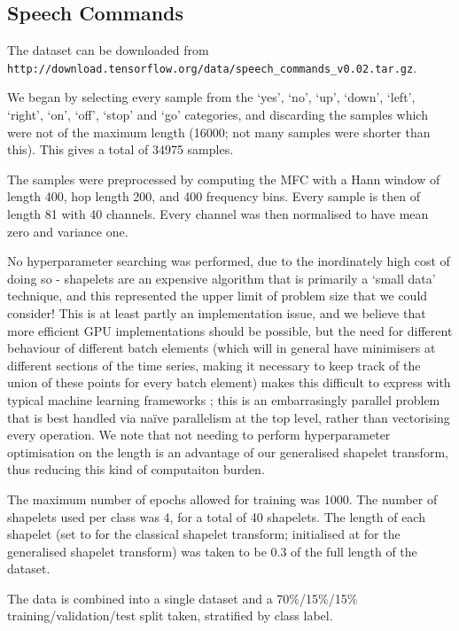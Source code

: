 \documentclass{article}
\theoremstyle{plain}
\theoremstyle{definition}
\begin{document}
	\subsection{Speech Commands}
	The dataset can be downloaded from\\ \texttt{http://download.tensorflow.org/data/speech\_commands\_v0.02.tar.gz}.
	
	We began by selecting every sample from the `yes', `no', `up', `down', `left', `right', `on', `off', `stop' and `go' categories, and discarding the samples which were not of the maximum length (16000; not many samples were shorter than this). This gives a total of 34975 samples.
	
	The samples were preprocessed by computing the MFC with a Hann window of length 400, hop length 200, and 400 frequency bins. Every sample is then of length 81 with 40 channels. Every channel was then normalised to have mean zero and variance one.
	
	No hyperparameter searching was performed, due to the inordinately high cost of doing so - shapelets are an expensive algorithm that is primarily a `small data' technique, and this represented the upper limit of problem size that we could consider! This is at least partly an implementation issue, and we believe that more efficient GPU implementations should be possible, but the need for different behaviour of different batch elements (which will in general have minimisers at different sections of the time series, making it necessary to keep track of the union of these points for every batch element) makes this difficult to express with typical machine learning frameworks \cite{tensorflow, pytorch, jax}; this is an embarrasingly parallel problem that is best handled via na{\"i}ve parallelism at the top level, rather than vectorising every operation. We note that not needing to perform hyperparameter optimisation on the length is an advantage of our generalised shapelet transform, thus reducing this kind of computaiton burden.
	
	The maximum number of epochs allowed for training was 1000. The number of shapelets used per class was 4, for a total of 40 shapelets. The length of each shapelet (set to for the classical shapelet transform; initialised at for the generalised shapelet transform) was taken to be 0.3 of the full length of the dataset.
	
	The data is combined into a single dataset and a 70\%/15\%/15\% training/validation/test split taken, stratified by class label.
\end{document}
